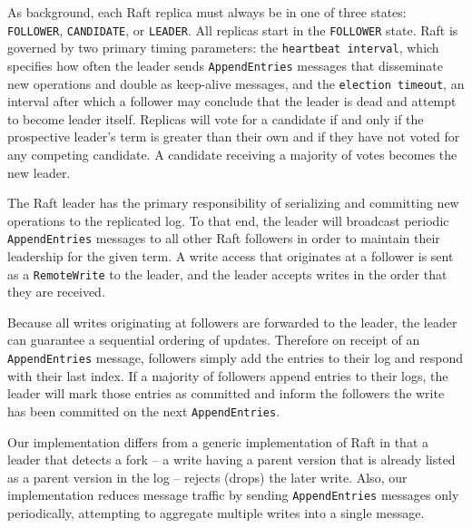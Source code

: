 \documentclass[10pt,conference,letterpaper]{IEEEtran}
\begin{document}
As background, each Raft replica must always be in one of three states: \texttt{FOLLOWER},
\texttt{CANDIDATE}, or \texttt{LEADER}.
All replicas start in the \texttt{FOLLOWER} state.
Raft is governed by two primary timing parameters: the \texttt{heartbeat interval}, which
specifies how often the leader sends \texttt{AppendEntries} messages that disseminate new
operations and double as
keep-alive messages, and the \texttt{election timeout}, an interval after which a follower
may conclude that the leader is dead and attempt to become leader itself.
Replicas will vote for a candidate if and only if the prospective leader's term is greater
than their own and if they have not voted for any competing candidate.
A candidate receiving a majority of votes becomes the new leader.

The Raft leader has the primary responsibility of serializing and committing new
operations to the replicated log.
To that end, the leader will broadcast periodic \texttt{AppendEntries} messages to all
other Raft followers in order to maintain their leadership for the given term.
A write access that originates at a follower is sent as a \texttt{RemoteWrite} to the
leader, and the leader accepts writes in the order that they are received.

Because all writes originating at followers are forwarded to the leader, the leader can
guarantee a sequential ordering of updates.
Therefore on receipt of an \texttt{AppendEntries} message, followers simply add the
entries to their log and respond with their last index.
If a majority of followers append entries to their logs, the leader will mark those
entries as committed and inform the followers the write has been committed on the next
\texttt{AppendEntries}.

Our implementation differs from a generic implementation of Raft in that
a leader that detects a
fork -- a write having a parent version that is already listed as a parent version in the
log -- rejects (drops) the later write.
Also, our implementation reduces message traffic by sending \texttt{AppendEntries}
messages only periodically, attempting to aggregate multiple writes into a single
message.

\end{document}

